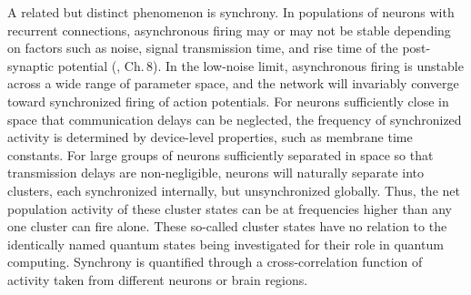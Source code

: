 \documentclass[twocolumn]{article}
\begin{document}
A related but distinct phenomenon is synchrony. In populations of neurons with recurrent connections, asynchronous firing may or may not be stable depending on factors such as noise, signal transmission time, and rise time of the post-synaptic potential (\cite{geki2002}, Ch.\,8). In the low-noise limit, asynchronous firing is unstable across a wide range of parameter space, and the network will invariably converge toward synchronized firing of action potentials. For neurons sufficiently close in space that communication delays can be neglected, the frequency of synchronized activity is determined by device-level properties, such as membrane time constants. For large groups of neurons sufficiently separated in space so that transmission delays are non-negligible, neurons will naturally separate into clusters, each synchronized internally, but unsynchronized globally. Thus, the net population activity of these cluster states can be at frequencies higher than any one cluster can fire alone. These so-called cluster states have no relation to the identically named quantum states being investigated for their role in quantum computing. Synchrony is quantified through a cross-correlation function of activity taken from different neurons or brain regions.
\end{document}
